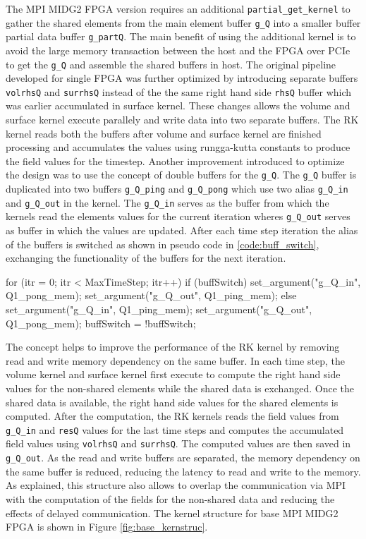 The MPI MIDG2 FPGA version requires an additional \texttt{partial\_get\_kernel} to gather the shared elements from
the main element buffer \texttt{g\_Q} into a smaller buffer partial data buffer \texttt{g\_partQ}.
The main benefit of using the additional kernel is to avoid the large memory transaction between the
host and the FPGA over PCIe to get the \texttt{g\_Q} and assemble the shared buffers in host.
The original pipeline developed for single FPGA was further optimized by introducing separate buffers
\texttt{volrhsQ} and \texttt{surrhsQ} instead of the the same right hand side \texttt{rhsQ} buffer
which was earlier accumulated in surface kernel. These changes allows the volume and surface kernel
execute parallely and write data into two separate buffers. The RK kernel reads both the buffers
after volume and surface kernel are finished processing and accumulates the values using rungga-kutta
constants to produce the field values for the timestep. Another improvement introduced to optimize the
design was to use the concept of double buffers for the \texttt{g\_Q}. The \texttt{g\_Q} buffer is
duplicated into two buffers \texttt{g\_Q\_ping} and \texttt{g\_Q\_pong} which use two alias \texttt{g\_Q\_in}
and \texttt{g\_Q\_out} in the kernel. The \texttt{g\_Q\_in} serves as the buffer from which the kernels read
the elements values for the current iteration wheres \texttt{g\_Q\_out} serves as buffer in which the values
are updated. After each time step iteration the alias of the buffers is switched as shown
in pseudo code in \ref{code:buff_switch}, exchanging the functionality of the buffers for the next iteration.

\begin{CppCode}[caption=Buffer switching for double buffers in each iteration, frame=tlrb, label=code:buff_switch]
for (itr = 0; itr < MaxTimeStep; itr++)
{
    if (buffSwitch)
    {
        set_argument("g_Q_in", Q1_pong_mem);
        set_argument("g_Q_out", Q1_ping_mem);
    }
    else
    {
        set_argument("g_Q_in", Q1_ping_mem);
        set_argument("g_Q_out", Q1_pong_mem);
    }
    buffSwitch = !buffSwitch;
}
\end{CppCode}

The concept helps to improve the performance of the RK kernel
by removing read and write memory dependency on the same buffer. In each time step,
the volume kernel and surface kernel first execute to compute the right hand side values for the
non-shared elements while the shared data is exchanged. Once the shared data is available,
the right hand side values for the shared elements is computed. After the computation,
the RK kernels reads the field values from \texttt{g\_Q\_in} and \texttt{resQ} values
for the last time steps and computes the accumulated field values using
\texttt{volrhsQ} and \texttt{surrhsQ}. The computed values are then saved in \texttt{g\_Q\_out}.
As the read and write buffers are separated, the memory dependency on the same buffer is reduced,
reducing the latency to read and write to the memory. As explained, this structure also allows
to overlap the communication via MPI with the computation of the fields for the non-shared data
and reducing the effects of delayed communication. The kernel structure for base MPI MIDG2 FPGA
is shown in Figure \ref{fig:base_kernstruc}.

